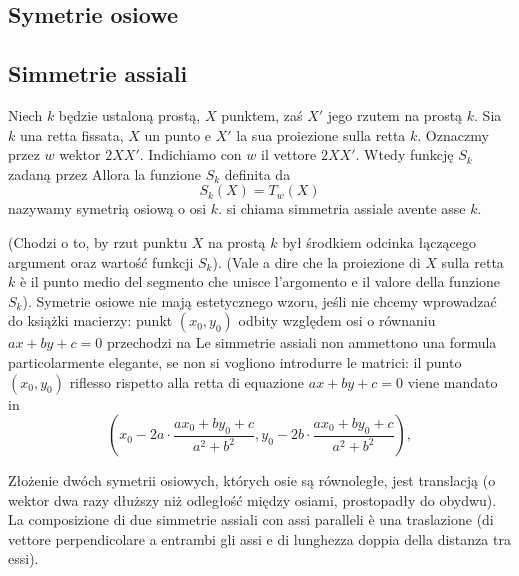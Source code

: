 %

\subsection{Symetrie osiowe} %
\subsection{Simmetrie assiali} %

\begin{definition}
[symetria osiowa] %
[simmetria assiale] %
    Niech $k$ będzie ustaloną prostą, $X$ punktem, zaś $X'$ jego rzutem na prostą $k$. %
    Sia $k$ una retta fissata, $X$ un punto e $X'$ la sua proiezione sulla retta $k$. %
    Oznaczmy przez $w$ wektor $2X X'$. %
    Indichiamo con $w$ il vettore $2X X'$. %
    Wtedy funkcję $S_k$ zadaną przez %
    Allora la funzione $S_k$ definita da %
    \begin{equation}
        S_k(X) = T_{w}(X)
    \end{equation}
    nazywamy symetrią osiową o osi $k$. %
    si chiama simmetria assiale avente asse $k$. %
\end{definition}

(Chodzi o to, by rzut punktu $X$ na prostą $k$ był środkiem odcinka łączącego argument oraz wartość funkcji $S_k$). %
(Vale a dire che la proiezione di $X$ sulla retta $k$ è il punto medio del segmento che unisce l'argomento e il valore della funzione $S_k$). %
Symetrie osiowe nie mają estetycznego wzoru, jeśli nie chcemy wprowadzać do książki macierzy: punkt $(x_0, y_0)$ odbity względem osi o równaniu $ax + by + c = 0$ przechodzi na %
Le simmetrie assiali non ammettono una formula particolarmente elegante, se non si vogliono introdurre le matrici: il punto $(x_0, y_0)$ riflesso rispetto alla retta di equazione $ax + by + c = 0$ viene mandato in %
\begin{equation}
    \left(
    x_0 - 2a \cdot \frac{ax_0 + by_0 + c}{a^2 + b^2},
    y_0 - 2b \cdot \frac{ax_0 + by_0 + c}{a^2 + b^2}
    \right),
\end{equation}

\begin{proposition}
\label{kordos_banach_6}%
    Złożenie dwóch symetrii osiowych, których osie są równoległe, jest translacją (o wektor dwa razy dłuższy niż odległość między osiami, prostopadły do obydwu). %
    La composizione di due simmetrie assiali con assi paralleli è una traslazione (di vettore perpendicolare a entrambi gli assi e di lunghezza doppia della distanza tra essi). %
\end{proposition}

